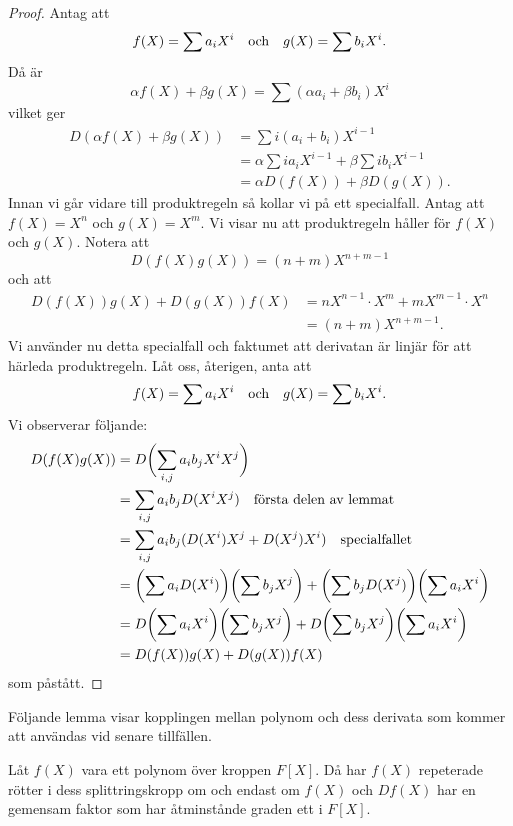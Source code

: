 \documentclass{article}
\theoremstyle{definition}
\begin{document}
\begin{proof}
  Antag att 
  \[f(X) = \sum a_iX^i \quad \textnormal{och} \quad g(X) = \sum b_iX^i.\]
  Då är 
  \[\alpha f(X) + \beta g(X) = \sum (\alpha a_i + \beta b_i)X^i\]
  vilket ger 
  \begin{align*}
    D(\alpha f(X) + \beta g(X)) &= \sum i(a_i + b_i)X^{i-1} \\
    &= \alpha \sum ia_i X^{i-1} + \beta \sum ib_i X^{i-1} \\
    &= \alpha D(f(X)) + \beta D(g(X)).
  \end{align*}
  Innan vi går vidare till produktregeln så kollar vi på ett specialfall. Antag att $f(X) = X^n$ och $g(X) = X^m$. Vi visar nu att 
  produktregeln håller för $f(X)$ och $g(X)$. Notera att 
  \[D(f(X)g(X)) = (n+m)X^{n+m-1}\]
  och att 
  \begin{align*}
    D(f(X))g(X) + D(g(X)) f(X) &= nX^{n-1} \cdot X^m + mX^{m-1} \cdot X^n \\
    &= (n+m)X^{n+m-1}.
  \end{align*}
  Vi använder nu detta specialfall och faktumet att derivatan är linjär för att härleda produktregeln. 
  Låt oss, återigen, anta att
  \[f(X) = \sum a_iX^i \quad \textnormal{och} \quad g(X) = \sum b_iX^i. \]
  Vi observerar följande:
  \begin{align*}
    D(f(X)g(X)) &= D \biggl( \sum_{i, j} a_i b_j X^i X^j\biggr) \\
    &= \sum_{i, j} a_i b_j D(X^iX^j) \quad \textnormal{första delen av lemmat} \\
    &= \sum_{i, j} a_i b_j (D(X^i)X^j + D(X^j)X^i ) \quad \textnormal{specialfallet} \\
    &= \biggl (  \sum a_i D(X^i) \biggr) \biggl (  \sum b_jX^j \biggr) + \biggl ( \sum b_j D(X^j)  \biggr) \biggl ( \sum a_iX^i  \biggr) \\
    &= D \biggl (  \sum a_i X^i \biggr) \biggl (  \sum b_jX^j \biggr) + D \biggl ( \sum b_j X^j  \biggr) \biggl ( \sum a_iX^i  \biggr) \\
    &= D(f(X)) g(X) + D(g(X)) f(X)
  \end{align*}
  som påstått.
\end{proof}

Följande lemma visar kopplingen mellan polynom och dess derivata som kommer att användas vid senare tillfällen. 

\hypertarget{lemma7.2.1}{}
\begin{mylemma}{}{}
  Låt $f(X)$ vara ett polynom över kroppen $F[X]$. Då har $f(X)$ repeterade rötter i dess splittringskropp om och endast om $f(X)$ och $Df(X)$
  har en gemensam faktor som har åtminstånde graden ett i $F[X]$.
\end{mylemma}
\end{document}
